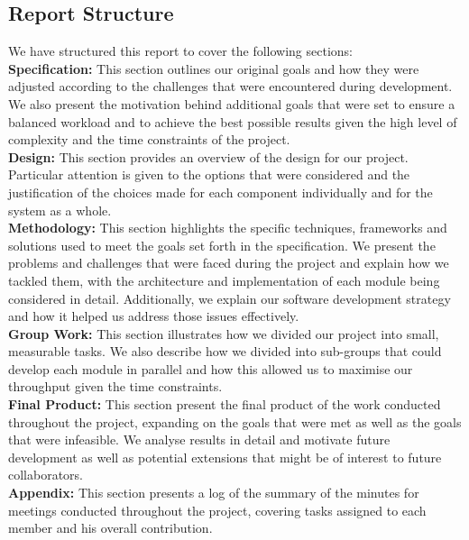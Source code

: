 \documentclass[a4paper,11pt]{article}
\begin{document}
\subsection{Report Structure}
We have structured this report to cover the following sections:\\

\noindent
\textbf{Specification:}
This section outlines our original goals and how they were adjusted according to the challenges that were encountered during development. We also present the motivation behind additional goals that were set to ensure a balanced workload and to achieve the best possible results given the high level of complexity and the time constraints of the project.\\

\noindent
\textbf{Design:} This section provides an overview of the design for our project. Particular attention is given to the options that were considered and the justification of the choices made for each component individually and for the system as a whole.\\

\noindent
\textbf{Methodology:} This section highlights the specific techniques, frameworks and solutions used to meet the goals set forth in the specification. We present the problems and challenges that were faced during the project and explain how we tackled them, with the architecture and implementation of each module being considered in detail. Additionally, we explain our software development strategy and how it helped us address those issues effectively.\\

\noindent
\textbf{Group Work:} This section illustrates how we divided our project into small, measurable tasks. We also describe how we divided into sub-groups that could develop each module in parallel and how this allowed us to maximise our throughput given the time constraints.\\

\noindent
\textbf{Final Product:} This section present the final product of the work conducted throughout the project, expanding on the goals that were met as well as the goals that were infeasible. We analyse results in detail and motivate future development as well as potential extensions that might be of interest to future collaborators.\\

\noindent
\textbf{Appendix:} This section presents a log of the summary of the minutes for meetings conducted throughout the project, covering tasks assigned to each member and his overall contribution. 
\end{document}
